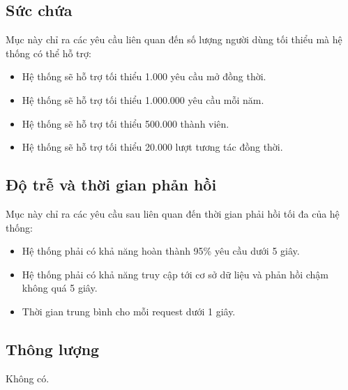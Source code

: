\documentclass[./../main_file.tex]{subfiles}
\begin{document}
\subsection{Sức chứa}

Mục này chỉ ra các yêu cầu liên quan đến số lượng người dùng tối thiểu mà hệ thống có thể hỗ trợ:

\begin{itemize}
	\item Hệ thống sẽ hỗ trợ tối thiểu 1.000 yêu cầu mở đồng thời.
	\item Hệ thống sẽ hỗ trợ tối thiểu 1.000.000 yêu cầu mỗi năm.
	\item Hệ thống sẽ hỗ trợ tối thiểu 500.000 thành viên.
	\item Hệ thống sẽ hỗ trợ tối thiểu 20.000 lượt tương tác đồng thời.
\end{itemize}

\subsection{Độ trễ và thời gian phản hồi}

Mục này chỉ ra các yêu cầu sau liên quan đến thời gian phải hồi tối đa của hệ thống:
\begin{itemize}
	\item Hệ thống phải có khả năng hoàn thành 95\% yêu cầu dưới 5 giây.
	\item Hệ thống phải có khả năng truy cập tới cơ sở dữ liệu và phản hồi chậm không quá 5 giây.
	\item Thời gian trung bình cho mỗi request dưới 1 giây.
\end{itemize}

\subsection{Thông lượng}
Không có.
\end{document}
